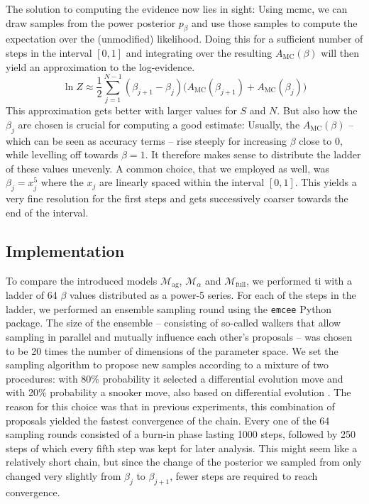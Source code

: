 \documentclass[\relativeRoot/main.tex]{subfiles}
\begin{document}
%
The solution to computing the evidence now lies in sight: Using \gls{mcmc}, we can draw samples from the power posterior $p_\beta$ and use those samples to compute the expectation over the (unmodified) likelihood. Doing this for a sufficient number of steps in the interval $\left[ 0, 1 \right]$ and integrating over the resulting $A_\text{MC}(\beta)$ will then yield an approximation to the log-evidence.
%
\begin{equation}
    \ln{Z} \approx \frac{1}{2} \sum_{j=1}^{N-1} \left( \beta_{j+1} - \beta_j \right) \big( A_\text{MC}(\beta_{j+1}) + A_\text{MC}(\beta_j) \big)
\end{equation}
%
This approximation gets better with larger values for $S$ and $N$. But also how the $\beta_j$ are chosen is crucial for computing a good estimate: Usually, the $A_\text{MC}(\beta)$ -- which can be seen as accuracy terms -- rise steeply for increasing $\beta$ close to 0, while levelling off towards $\beta=1$. It therefore makes sense to distribute the ladder of these values unevenly. A common choice, that we employed as well, was $\beta_j = x_j^5$ where the $x_j$ are linearly spaced within the interval $[0, 1]$. This yields a very fine resolution for the first steps and gets successively coarser towards the end of the interval.

\subsection*{Implementation}
\label{subsec:bilateral:model_comp:implementation}

To compare the introduced models $\mathcal{M}_\text{ag}$, $\mathcal{M}_\alpha$ and $\mathcal{M}_\text{full}$, we performed \gls{ti} with a ladder of 64 $\beta$ values distributed as a power-5 series. For each of the steps in the ladder, we performed an ensemble sampling round using the \texttt{emcee} \cite{foreman-mackey_emcee_2013} Python package. The size of the ensemble -- consisting of so-called walkers that allow sampling in parallel and mutually influence each other's proposals -- was chosen to be 20 times the number of dimensions of the parameter space. We set the sampling algorithm to propose new samples according to a mixture of two procedures: with 80\% probability it selected a differential evolution move \cite{nelson_run_2013} and with 20\% probability a snooker move, also based on differential evolution \cite{ter_braak_differential_2008}. The reason for this choice was that in previous experiments, this combination of proposals yielded the fastest convergence of the chain. Every one of the 64 sampling rounds consisted of a burn-in phase lasting 1000 steps, followed by 250 steps of which every fifth step was kept for later analysis. This might seem like a relatively short chain, but since the change of the posterior we sampled from only changed very slightly from $\beta_j$ to $\beta_{j+1}$, fewer steps are required to reach convergence.
\end{document}
